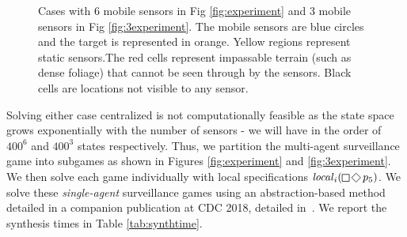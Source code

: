 \begin{figure}
\caption{Cases with 6 mobile sensors in Fig \ref{fig:experiment} and 3 mobile sensors in Fig \ref{fig:3experiment}. The mobile sensors are blue circles and the target is represented in orange. Yellow regions represent static sensors.The red cells represent impassable terrain (such as dense foliage) that cannot be seen through by the sensors. Black cells are locations not visible to any sensor.}\label{fig:bigexp}\vspace{-0.5cm}
\end{figure} 

Solving either case centralized is not computationally feasible as the state space grows exponentially with the number of sensors - we will have in the order of $400^6$ and $400^3$ states respectively. Thus, we partition the multi-agent surveillance game into subgames as shown in Figures \ref{fig:experiment} and \ref{fig:3experiment}. We then solve each game individually with local specifications $\locspec_i(\LTLglobally\LTLfinally p_5)$. We solve these \emph{single-agent} surveillance games using an abstraction-based method detailed in a companion publication at CDC 2018, detailed in~\cite{arxiv}. 
We report the synthesis times in Table \ref{tab:synthtime}.

